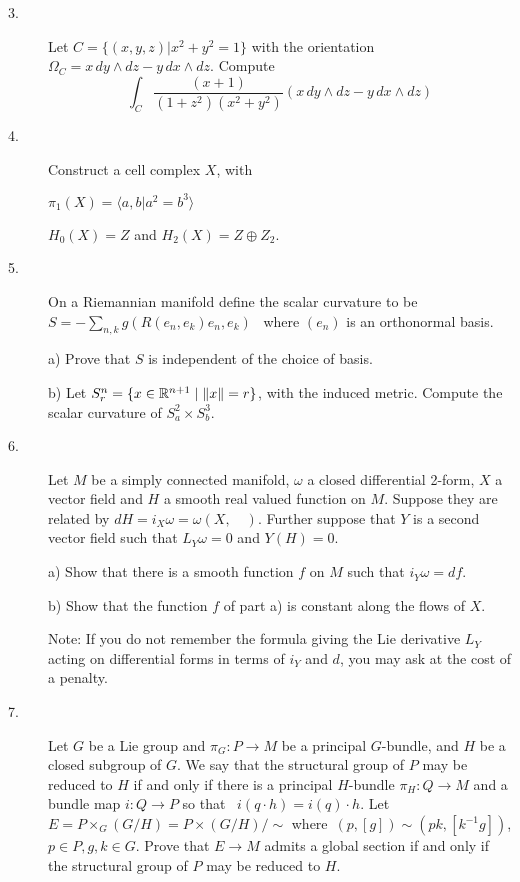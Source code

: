 \documentclass[bbb]{report}
\def\ds{\displaystyle}
\def\R{{\Bbb R}}
\begin{document}
\begin{large}
\begin{description}
\vspace{.2in}
\item[3.]
Let $C=\{(x,y,z)|x^2+y^2=1\}$ with the orientation
$\Omega_C=x\,dy\land dz-y\,dx\land dz$.
Compute
$$ \int_C\frac{(x+1)}{(1+z^2)(x^2+y^2)}
   (x\,dy\land dz-y\,dx\land dz) $$


\vspace{.2in}
\item[4.]
Construct a cell complex $X$, with

\item[\quad] $\pi_1(X)=\langle a,b|a^2=b^3\rangle $
\item[\quad] $H_0(X)=Z$ and $H_2(X) =Z\oplus Z_2$.


\vfill
\pagebreak


\vspace{.75in}
\item[5.]
On a Riemannian manifold define the scalar curvature to be
\ $ S=-\ds\sum_{n,k}g(R(e_n,e_k)e_n,e_k) $ \ where $(e_n)$ is
an orthonormal basis.

\item[\quad] a)
Prove that $S$ is independent of the choice of basis.

\item[\quad] b)
Let $S^n_r=\{ x\in\R^{n+1}\mid \| x\|=r\}$,
with the induced metric. Compute the scalar curvature of
$S^2_a\times S^3_b$.



\vspace{.2in}
\item[6.]
Let $M$ be a simply connected manifold, $\omega$ a closed differential
2-form, $X$ a vector field and $H$ a smooth real valued function on
$M$. Suppose they are related by $dH=i_X\omega=\omega(X,\quad )$.
Further suppose that $Y$ is a second vector field such that $L_Y\omega=0$
and $Y(H)=0$.

\item[\quad] a)
Show that there is a smooth function $f$ on $M$ such that $i_Y\omega=df$.

\item[\quad] b) Show that the function $f$ of part a) is
constant along the flows of $X$.

\item[\quad] Note: If you do not remember the formula giving the Lie
derivative $L_Y$ acting on differential forms in terms of $i_Y$ and $d$,
you may ask at the cost of a penalty.



\vspace{.2in}
\item[7.]
Let $G$ be a Lie group and $\pi_G:P\to M$ be a principal $G$-bundle,
and $H$ be a closed subgroup of $G$. We say that the structural
group of $P$ may be reduced to $H$ if and only if there is a principal
$H$-bundle $\pi_H:Q\to M$ and a bundle map $i:Q\to P$ so that
\ $i(q\cdot h)=i(q)\cdot h$.
Let $E=P\times_G(G/H)=P\times(G/H)/\sim$
 where\ $(p,[g])\sim (pk,[k^{-1}g])$, $p\in P,g,k\in G$.
Prove that $E\to M$ admits a global section if and only if the
structural group of $P$ may be reduced to $H$.


\end{description}
\end{large}
\end{document}
